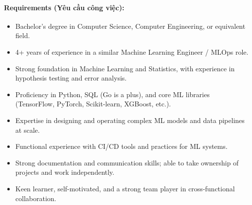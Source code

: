\paragraph{Requirements (Yêu cầu công việc):}
\begin{itemize}
    \item Bachelor's degree in Computer Science, Computer Engineering, or equivalent field.
    \item 4+ years of experience in a similar Machine Learning Engineer / MLOps role.
    \item Strong foundation in Machine Learning and Statistics, with experience in hypothesis testing and error analysis.
    \item Proficiency in Python, SQL (Go is a plus), and core ML libraries (TensorFlow, PyTorch, Scikit-learn, XGBoost, etc.).
    \item Expertise in designing and operating complex ML models and data pipelines at scale.
    \item Functional experience with CI/CD tools and practices for ML systems.
    \item Strong documentation and communication skills; able to take ownership of projects and work independently.
    \item Keen learner, self-motivated, and a strong team player in cross-functional collaboration.
\end{itemize}
